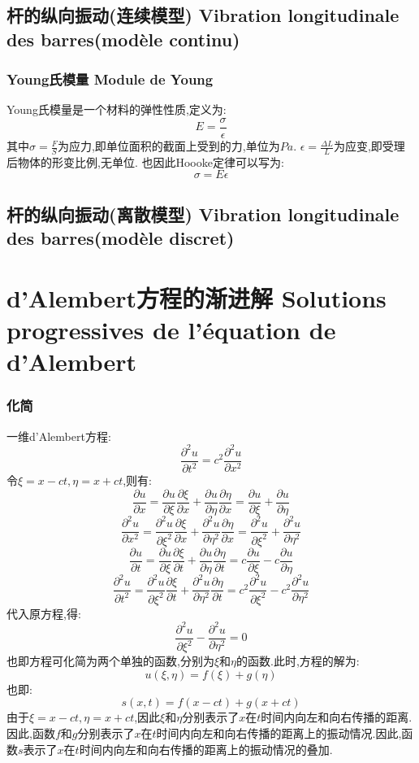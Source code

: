 \documentclass[12pt, a4paper, oneside]{ctexbook}
\newcommand{\pian }{\partial}%
\begin{document}
\subsection{杆的纵向振动(连续模型) Vibration longitudinale des barres(modèle continu)}
\subsubsection{Young氏模量 Module de Young} 
Young氏模量是一个材料的弹性性质,定义为:
$$
  E=\frac{\sigma}{\epsilon}
$$
其中$\sigma=\frac{F}{S}$为应力,即单位面积的截面上受到的力,单位为$Pa$. 
$\epsilon=\frac{\Delta L}{L}$为应变,即受理后物体的形变比例,无单位.
也因此Hoooke定律可以写为:
$$
  \sigma=E\epsilon
$$
\subsection{杆的纵向振动(离散模型) Vibration longitudinale des barres(modèle discret)}
\section{d'Alembert方程的渐进解 Solutions progressives de l'équation de d'Alembert}
\subsubsection{化简}
一维d'Alembert方程:
$$
  \frac{\pian^2 u}{\pian t^2}=c^2\frac{\pian^2 u}{\pian x^2}
$$
令$\xi=x-ct,\eta=x+ct$,则有:
$$
  \frac{\pian u}{\pian x}=\frac{\pian u}{\pian \xi}\frac{\pian \xi}{\pian x}+\frac{\pian u}{\pian \eta}\frac{\pian \eta}{\pian x}=\frac{\pian u}{\pian \xi}+\frac{\pian u}{\pian \eta}
$$
$$
  \frac{\pian^2 u}{\pian x^2}=\frac{\pian^2 u}{\pian \xi^2}\frac{\pian \xi}{\pian x}+\frac{\pian^2 u}{\pian \eta^2}\frac{\pian \eta}{\pian x}=\frac{\pian^2 u}{\pian \xi^2}+\frac{\pian^2 u}{\pian \eta^2}
$$
$$
  \frac{\pian u}{\pian t}=\frac{\pian u}{\pian \xi}\frac{\pian \xi}{\pian t}+\frac{\pian u}{\pian \eta}\frac{\pian \eta}{\pian t}=c\frac{\pian u}{\pian \xi}-c\frac{\pian u}{\pian \eta}
$$
$$
  \frac{\pian^2 u}{\pian t^2}=\frac{\pian^2 u}{\pian \xi^2}\frac{\pian \xi}{\pian t}+\frac{\pian^2 u}{\pian \eta^2}\frac{\pian \eta}{\pian t}=c^2\frac{\pian^2 u}{\pian \xi^2}-c^2\frac{\pian^2 u}{\pian \eta^2}
$$
代入原方程,得:
$$
  \frac{\pian^2 u}{\pian \xi^2}-\frac{\pian^2 u}{\pian \eta^2}=0
$$
也即方程可化简为两个单独的函数,分别为$\xi$和$\eta$的函数.此时,方程的解为:
$$
  u(\xi,\eta)=f(\xi)+g(\eta)
$$
也即:
$$
  s(x,t)=f(x-ct)+g(x+ct)
$$
由于$\xi=x-ct,\eta=x+ct$,因此$\xi$和$\eta$分别表示了$x$在$t$时间内向左和向右传播的距离.因此,函数$f$和$g$分别表示了$x$在$t$时间内向左和向右传播的距离上的振动情况.因此,函数$s$表示了$x$在$t$时间内向左和向右传播的距离上的振动情况的叠加.
\end{document}
